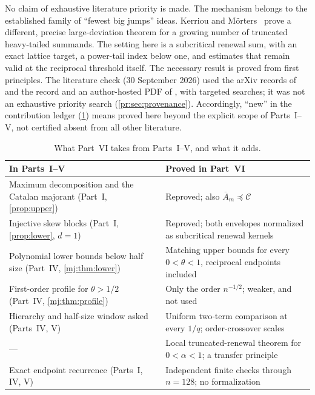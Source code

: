 \documentclass[11pt,a4paper]{article}
\theoremstyle{definition}\newaliascnt{definition}{theorem}
\theoremstyle{remark}\newaliascnt{remark}{theorem}
\newcommand{\Cat}{\mathcal C}
\newcommand{\preceqc}{\preceq}
\begin{document}
No claim of exhaustive literature priority is made. The mechanism belongs to
the established family of ``fewest big jumps'' ideas. Kerriou and
M\"orters~\cite{pr:KerriouMorters} prove a different, precise
large-deviation theorem for a growing number of truncated heavy-tailed
summands. The setting here is a subcritical renewal sum, with an exact
lattice target, a power-tail index below one, and estimates that remain
valid at the reciprocal threshold itself. The necessary result is proved from
first principles. The literature check (30 September 2026) used the arXiv
records of \cite{Nadler,MayamaAkita} and the record and an author-hosted PDF
of \cite{pr:KerriouMorters}, with targeted searches; it was not an exhaustive
priority search (\cref{pr:sec:provenance}). Accordingly, ``new'' in the
contribution ledger (\cref{pr:tab:ledger}) means proved here beyond the
explicit scope of Parts~I--V, not certified absent from all other
literature.

\begin{table}[htbp]
\centering\small
\caption{What Part~VI takes from Parts~I--V, and what it adds.}
\label{pr:tab:ledger}
\begin{tabular}{>{\raggedright}p{.43\linewidth}>{\raggedright\arraybackslash}p{.49\linewidth}}
\toprule
In Parts~I--V & Proved in Part~VI\\
\midrule
Maximum decomposition and the Catalan majorant (Part~I, \cref{prop:upper}) & Reproved; also $\overline A_m\preceqc\Cat$\\
Injective skew blocks (Part~I, \cref{prop:lower}, $d=1$) & Reproved; both envelopes normalized as subcritical renewal kernels\\
Polynomial lower bounds below half size (Part~IV, \cref{mj:thm:lower}) & Matching upper bounds for every $0<\theta<1$, reciprocal endpoints included\\
First-order profile for $\theta>1/2$ (Part~IV, \cref{mj:thm:profile}) & Only the order $n^{-1/2}$; weaker, and not used\\
Hierarchy and half-size window asked (Parts~IV, V) & Uniform two-term comparison at every $1/q$; order-crossover scales\\
--- & Local truncated-renewal theorem for $0<\alpha<1$; a transfer principle\\
Exact endpoint recurrence (Parts~I, IV, V) & Independent finite checks through $n=128$; no formalization\\
\bottomrule
\end{tabular}
\end{table}
\end{document}
